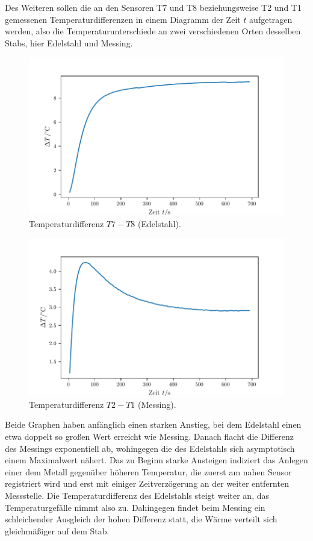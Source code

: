 Des Weiteren sollen die an den Sensoren T7 und T8 beziehungsweise T2 und T1 gemessenen Temperaturdifferenzen in einem 
Diagramm der Zeit $t$ aufgetragen werden, also die Temperaturunterschiede an zwei verschiedenen Orten desselben Stabs, 
hier Edelstahl und Messing. 
\begin{figure}
    \centering
    \includegraphics[max width=\linewidth]{plots/plot_tempDiff_steel.pdf}
    \caption{Temperaturdifferenz $T7 - T8$ (Edelstahl).}
    \label{fig:plot_tempDiff_t7t8}
\end{figure}

\begin{figure}
    \centering
    \includegraphics[max width=\linewidth]{plots/plot_tempDiff_brass_wide.pdf}
    \caption{Temperaturdifferenz $T2 - T1$ (Messing).}
    \label{fig:plot_tempDiff_t2t1}
\end{figure}
Beide Graphen haben anfänglich einen starken Anstieg, bei dem Edelstahl einen etwa doppelt so großen Wert erreicht wie Messing. 
Danach flacht die Differenz des Messings exponentiell ab, wohingegen die des Edelstahls sich asymptotisch einem Maximalwert nähert. 
Das zu Beginn starke Ansteigen indiziert das Anlegen einer dem Metall gegenüber höheren Temperatur, die zuerst am nahen 
Sensor registriert wird und erst mit einiger Zeitverzögerung an der weiter entfernten Messstelle. 
Die Temperaturdifferenz des Edelstahls steigt weiter an, das Temperaturgefälle nimmt also zu.
Dahingegen findet beim Messing ein schleichender Ausgleich der hohen Differenz statt, die Wärme verteilt sich gleichmäßiger auf dem Stab.  

